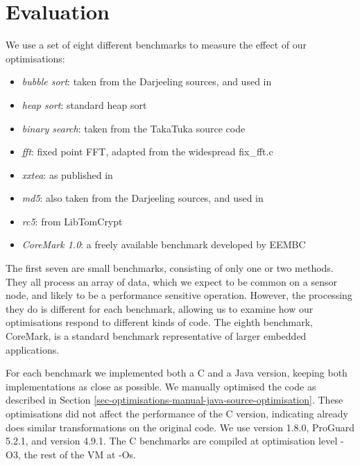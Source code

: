 \chapter{Evaluation}
\label{sec-evaluation}

We use a set of eight different benchmarks to measure the effect of our optimisations:

\begin{itemize}
\item \emph{bubble sort}: taken from the Darjeeling sources, and used in \cite{Brouwers:2009cj, Ellul:2012thesis}
\item \emph{heap sort}: standard heap sort \cite{heapsort}
\item \emph{binary search}: taken from the TakaTuka \cite{Aslam:2008} source code
\item \emph{fft}: fixed point FFT, adapted from the widespread fix\_fft.c
\item \emph{xxtea}: as published in \cite{Wheeler:1998}
\item \emph{md5}: also taken from the Darjeeling sources, and used in \cite{Brouwers:2009cj, Ellul:2012thesis}
\item \emph{rc5}: from LibTomCrypt \cite{libtomcrypt}
\item \emph{CoreMark 1.0}: a freely available benchmark developed by EEMBC \cite{coremark}
\end{itemize}

The first seven are small benchmarks, consisting of only one or two methods. They all process an array of data, which we expect to be common on a sensor node, and likely to be a performance sensitive operation. However, the processing they do is different for each benchmark, allowing us to examine how our optimisations respond to different kinds of code. The eighth benchmark, CoreMark, is a standard benchmark representative of larger embedded applications.

For each benchmark we implemented both a C and a Java version, keeping both implementations as close as possible. We manually optimised the code as described in Section \ref{sec-optimisations-manual-java-source-optimisation}. These optimisations did not affect the performance of the C version, indicating  already does similar transformations on the original code. We use  version 1.8.0, ProGuard 5.2.1, and  version 4.9.1. The C benchmarks are compiled at optimisation level -O3, the rest of the VM at -Os.

